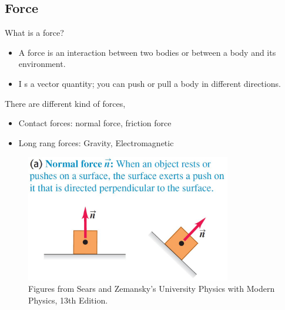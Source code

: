 \documentclass[]{beamer}
\begin{document}
\subsection{Force}

\begin{frame}

What is a force?

\vspace{5mm}
\pause

\begin{itemize}
    \item A force is
    an interaction between two bodies or between a body and its environment.
    \item I s a vector quantity; you can push or pull a body in
    different directions.
\end{itemize}
\vspace{5mm}
\pause


\end{frame}


\begin{frame}

    There are different kind of forces,
    
    \vspace{5mm}
    \pause
    
    \begin{itemize}
        \item Contact forces: normal force, friction force
        \item Long rang forces: Gravity, Electromagnetic
    \end{itemize}
    
  


    
    
    \end{frame}



\begin{frame}

    \begin{figure}[h!]  
        \includegraphics[width=0.8\textwidth]{images/f1.jpg}
        \caption{ {\tiny Figures from Sears and Zemansky's University Physics 
        with Modern Physics, 13th Edition.} }
      \end{figure}
  


    
    
    \end{frame}
\end{document}
